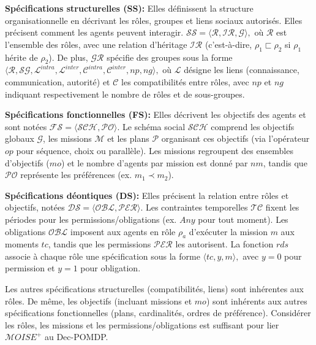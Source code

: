 \documentclass[final]{jfsma}
\begin{document}
\noindent \textbf{Spécifications structurelles (SS):}
Elles définissent la structure organisationnelle en décrivant les rôles, groupes et liens sociaux autorisés. Elles précisent comment les agents peuvent interagir.
$
  \mathcal{SS} = \langle \mathcal{R}, \mathcal{IR}, \mathcal{G} \rangle,
$
où \(\mathcal{R}\) est l'ensemble des rôles, avec une relation d'héritage \(\mathcal{IR}\) (c'est-à-dire, \(\rho_1 \sqsubset \rho_2\) si \(\rho_1\) hérite de \(\rho_2\)). De plus, \(\mathcal{GR}\) spécifie des groupes sous la forme
$
  \langle \mathcal{R}, \mathcal{SG}, \mathcal{L}^{intra}, \mathcal{L}^{inter}, \mathcal{C}^{intra}, \mathcal{C}^{inter}, np, ng \rangle,
$
où \(\mathcal{L}\) désigne les liens (connaissance, communication, autorité) et \(\mathcal{C}\) les compatibilités entre rôles, avec \(np\) et \(ng\) indiquant respectivement le nombre de rôles et de sous-groupes.

\vspace{0.5em}
\noindent \textbf{Spécifications fonctionnelles (FS):}
Elles décrivent les objectifs des agents et sont notées
$
  \mathcal{FS} = \langle \mathcal{SCH}, \mathcal{PO} \rangle.
$
Le schéma social \(\mathcal{SCH}\) comprend les objectifs globaux \(\mathcal{G}\), les missions \(\mathcal{M}\) et les plans \(\mathcal{P}\) organisant ces objectifs (via l'opérateur \(op\) pour séquence, choix ou parallèle). Les missions regroupent des ensembles d'objectifs (\(mo\)) et le nombre d'agents par mission est donné par \(nm\), tandis que \(\mathcal{PO}\) représente les préférences (ex. \(m_1 \prec m_2\)).

\vspace{0.5em}
\noindent \textbf{Spécifications déontiques (DS):}
Elles précisent la relation entre rôles et objectifs, notées
$
  \mathcal{DS} = \langle \mathcal{OBL}, \mathcal{PER} \rangle.
$
Les contraintes temporelles \(\mathcal{TC}\) fixent les périodes pour les permissions/obligations (ex. \(Any\) pour tout moment). Les obligations \(\mathcal{OBL}\) imposent aux agents en rôle \(\rho_a\) d'exécuter la mission \(m\) aux moments \(tc\), tandis que les permissions \(\mathcal{PER}\) les autorisent. La fonction \(rds\) associe à chaque rôle une spécification sous la forme
$
  \langle tc, y, m \rangle,
$
avec \(y=0\) pour permission et \(y=1\) pour obligation.


Les autres spécifications structurelles (compatibilités, liens) sont inhérentes aux rôles. De même, les objectifs (incluant missions et \(mo\)) sont inhérents aux autres spécifications fonctionnelles (plans, cardinalités, ordres de préférence). Considérer les rôles, les missions et les permissions/obligations est suffisant pour lier \(\mathcal{M}OISE^+\) au Dec-POMDP.
\end{document}
